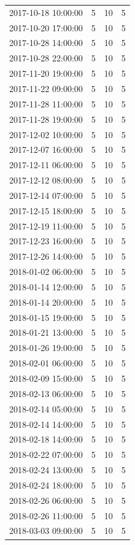 \begin{tabular}{lrrr}
2017-10-18 10:00:00 & 5 & 10 & 5 \\
2017-10-20 17:00:00 & 5 & 10 & 5 \\
2017-10-28 14:00:00 & 5 & 10 & 5 \\
2017-10-28 22:00:00 & 5 & 10 & 5 \\
2017-11-20 19:00:00 & 5 & 10 & 5 \\
2017-11-22 09:00:00 & 5 & 10 & 5 \\
2017-11-28 11:00:00 & 5 & 10 & 5 \\
2017-11-28 19:00:00 & 5 & 10 & 5 \\
2017-12-02 10:00:00 & 5 & 10 & 5 \\
2017-12-07 16:00:00 & 5 & 10 & 5 \\
2017-12-11 06:00:00 & 5 & 10 & 5 \\
2017-12-12 08:00:00 & 5 & 10 & 5 \\
2017-12-14 07:00:00 & 5 & 10 & 5 \\
2017-12-15 18:00:00 & 5 & 10 & 5 \\
2017-12-19 11:00:00 & 5 & 10 & 5 \\
2017-12-23 16:00:00 & 5 & 10 & 5 \\
2017-12-26 14:00:00 & 5 & 10 & 5 \\
2018-01-02 06:00:00 & 5 & 10 & 5 \\
2018-01-14 12:00:00 & 5 & 10 & 5 \\
2018-01-14 20:00:00 & 5 & 10 & 5 \\
2018-01-15 19:00:00 & 5 & 10 & 5 \\
2018-01-21 13:00:00 & 5 & 10 & 5 \\
2018-01-26 19:00:00 & 5 & 10 & 5 \\
2018-02-01 06:00:00 & 5 & 10 & 5 \\
2018-02-09 15:00:00 & 5 & 10 & 5 \\
2018-02-13 06:00:00 & 5 & 10 & 5 \\
2018-02-14 05:00:00 & 5 & 10 & 5 \\
2018-02-14 14:00:00 & 5 & 10 & 5 \\
2018-02-18 14:00:00 & 5 & 10 & 5 \\
2018-02-22 07:00:00 & 5 & 10 & 5 \\
2018-02-24 13:00:00 & 5 & 10 & 5 \\
2018-02-24 18:00:00 & 5 & 10 & 5 \\
2018-02-26 06:00:00 & 5 & 10 & 5 \\
2018-02-26 11:00:00 & 5 & 10 & 5 \\
2018-03-03 09:00:00 & 5 & 10 & 5 \\

\end{tabular}
